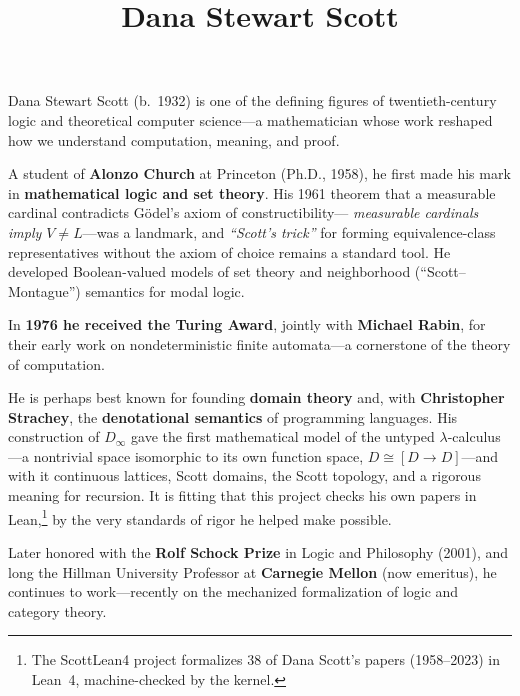\documentclass[11pt]{article}
\title{Dana Stewart Scott}
\author{}
\date{}
\begin{document}
\maketitle
\thispagestyle{empty}

Dana Stewart Scott (b.\ 1932) is one of the defining figures of twentieth-century
logic and theoretical computer science---a mathematician whose work reshaped how
we understand computation, meaning, and proof.

A student of \textbf{Alonzo Church} at Princeton (Ph.D., 1958), he first made his
mark in \textbf{mathematical logic and set theory}. His 1961 theorem that a
measurable cardinal contradicts G\"odel's axiom of constructibility---%
\emph{measurable cardinals imply $V \neq L$}---was a landmark, and
\emph{``Scott's trick''} for forming equivalence-class representatives without
the axiom of choice remains a standard tool. He developed Boolean-valued models
of set theory and neighborhood (``Scott--Montague'') semantics for modal logic.

In \textbf{1976 he received the Turing Award}, jointly with \textbf{Michael
Rabin}, for their early work on nondeterministic finite automata---a cornerstone
of the theory of computation.

He is perhaps best known for founding \textbf{domain theory} and, with
\textbf{Christopher Strachey}, the \textbf{denotational semantics} of programming
languages. His construction of $D_\infty$ gave the first mathematical model of
the untyped $\lambda$-calculus---a nontrivial space isomorphic to its own
function space, $D \cong [D \to D]$---and with it continuous lattices, Scott
domains, the Scott topology, and a rigorous meaning for recursion. It is fitting
that this project checks his own papers in Lean,\footnote{The ScottLean4 project
formalizes 38 of Dana Scott's papers (1958--2023) in Lean~4, machine-checked by
the kernel.} by the very standards of rigor he helped make possible.

Later honored with the \textbf{Rolf Schock Prize} in Logic and Philosophy (2001),
and long the Hillman University Professor at \textbf{Carnegie Mellon} (now
emeritus), he continues to work---recently on the mechanized formalization of
logic and category theory.
\end{document}

